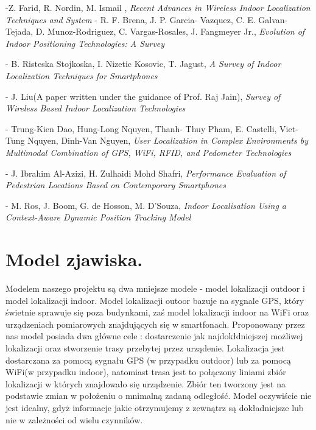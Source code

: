 \documentclass[11pt]{article}
\begin{document}
		\begin{thebibliography}{3}
			-Z. Farid, 
			R. Nordin, M. Ismail	, \textit{Recent Advances in Wireless Indoor Localization Techniques and System}
			\newline
			- R. F. Brena, J. P. Garcia-	Vazquez, C. E. Galvan-Tejada, D. Munoz-Rodriguez, C. Vargas-Rosales, J. 	Fangmeyer Jr., \textit{Evolution of Indoor Positioning Technologies: A Survey}
			
			\newline
			- B. Risteska Stojkoska, I. 	Nizetic Kosovic, T. Jagust, \textit{A Survey of Indoor Localization Techniques for Smartphones}
			
			\newline
			- J. Liu(A paper written under 	the guidance of Prof. Raj Jain), \textit{Survey of Wireless Based Indoor Localization Technologies}
			
			\newline
			- Trung-Kien Dao, Hung-Long Nquyen, Thanh-	Thuy Pham, E. Castelli, Viet-Tung Nquyen, Dinh-Van Nguyen, \textit{User Localization in Complex Environments by Multimodal Combination of GPS, WiFi, RFID, and Pedometer Technologies}
			
			\newline
			- J. Ibrahim Al-Azizi, H. Zulhaidi Mohd Shafri, \textit{Performance Evaluation of Pedestrian Locations Based on Contemporary Smartphones}
			
			\newline
			- M. Ros, 	J. Boom, G. de Hosson, M. D’Souza, \textit{Indoor Localisation Using a Context-Aware Dynamic Position Tracking Model}
			
		\end{thebibliography}
		
	\section{Model zjawiska.}
	
	
		Modelem naszego projektu są dwa mniejsze modele - model lokalizacji outdoor i model lokalizacji indoor. Model lokalizacji outoor bazuje na sygnale GPS, który świetnie sprawuje się poza budynkami, zaś model lokalizacji indoor na WiFi oraz urządzeniach pomiarowych znajdujących się w smartfonach. Proponowany przez nas model posiada dwa główne cele : dostarczenie jak najdokłdniejszej możliwej lokalizacji oraz stworzenie trasy przebytej przez urządenie. Lokalizacja jest dostarczana za pomocą sygnału GPS (w przypadku outdoor) lub za pomocą WiFi(w przypadku indoor), natomiast trasa jest to połączony liniami zbiór lokalizacji w których znajdowało się urządzenie. Zbiór ten tworzony jest na podstawie zmian w położeniu o mnimalną zadaną odległość. Model oczywiście nie jest idealny, gdyż informacje jakie otrzymujemy z zewnątrz są dokładniejsze lub nie w zależności od wielu czynników.
		
\end{document}
